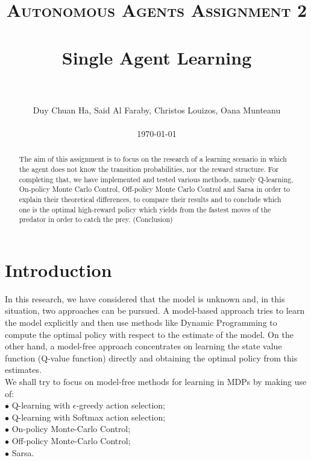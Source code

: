 \documentclass[paper=a4, fontsize=11pt]{scrartcl}
\title{
		\usefont{OT1}{bch}{b}{n}
		\normalfont \normalsize \textsc{Autonomous Agents Assignment 2} \\ [25pt]
		\horrule{0.5pt} \\[0.4cm]
		\huge Single Agent Learning \\
		\horrule{2pt} \\[0.5cm]
}
\author{
        Duy Chuan Ha, Said Al Faraby, Christos Louizos, Oana Munteanu %
        \\
        \\
        \today
}
\date{}
\numberwithin{equation}{section}		%
\numberwithin{figure}{section}			%
\numberwithin{table}{section}				%
\begin{document}
\maketitle
\bigskip
\begin{abstract}
The aim of this assignment is to focus on the research of a learning scenario in which the agent does not know the transition probabilities, nor the reward structure. For completing that, we have implemented and tested various methods, namely  Q-learning, On-policy Monte Carlo Control, Off-policy Monte Carlo Control and Sarsa in order to explain their theoretical differences, to compare their results and to conclude which one is the optimal high-reward policy which yields from the fastest moves of the predator in order to catch the prey. (Conclusion)\\
\end{abstract}

\section{Introduction}
In this research, we have considered that the model is unknown and, in this situation, two approaches can be pursued. A model-based approach tries to learn the model explicitly and then use methods like Dynamic Programming to compute the optimal policy with respect to the estimate of the model. On the other hand, a model-free approach concentrates on learning the state value function (Q-value function) directly and obtaining the optimal policy from this estimates.\\
We shall try to focus on model-free methods for learning in MDPs by making use of: \\
$\bullet$ Q-learning with $\epsilon$-greedy action selection; \\
$\bullet$ Q-learning with Softmax action selection; \\
$\bullet$ On-policy Monte-Carlo Control; \\
$\bullet$ Off-policy Monte-Carlo Control; \\
$\bullet$ Sarsa.
\end{document}
